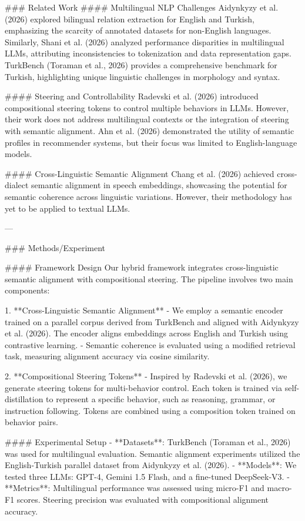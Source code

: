 ### Related Work  
#### Multilingual NLP Challenges  
Aidynkyzy et al. (2026) explored bilingual relation extraction for English and Turkish, emphasizing the scarcity of annotated datasets for non-English languages. Similarly, Shani et al. (2026) analyzed performance disparities in multilingual LLMs, attributing inconsistencies to tokenization and data representation gaps. TurkBench (Toraman et al., 2026) provides a comprehensive benchmark for Turkish, highlighting unique linguistic challenges in morphology and syntax.

#### Steering and Controllability  
Radevski et al. (2026) introduced compositional steering tokens to control multiple behaviors in LLMs. However, their work does not address multilingual contexts or the integration of steering with semantic alignment. Ahn et al. (2026) demonstrated the utility of semantic profiles in recommender systems, but their focus was limited to English-language models.

#### Cross-Linguistic Semantic Alignment  
Chang et al. (2026) achieved cross-dialect semantic alignment in speech embeddings, showcasing the potential for semantic coherence across linguistic variations. However, their methodology has yet to be applied to textual LLMs.

---

### Methods/Experiment  

#### Framework Design  
Our hybrid framework integrates cross-linguistic semantic alignment with compositional steering. The pipeline involves two main components:  

1. **Cross-Linguistic Semantic Alignment**  
   - We employ a semantic encoder trained on a parallel corpus derived from TurkBench and aligned with Aidynkyzy et al. (2026). The encoder aligns embeddings across English and Turkish using contrastive learning.  
   - Semantic coherence is evaluated using a modified retrieval task, measuring alignment accuracy via cosine similarity.  

2. **Compositional Steering Tokens**  
   - Inspired by Radevski et al. (2026), we generate steering tokens for multi-behavior control. Each token is trained via self-distillation to represent a specific behavior, such as reasoning, grammar, or instruction following. Tokens are combined using a composition token trained on behavior pairs.  

#### Experimental Setup  
- **Datasets**: TurkBench (Toraman et al., 2026) was used for multilingual evaluation. Semantic alignment experiments utilized the English-Turkish parallel dataset from Aidynkyzy et al. (2026).  
- **Models**: We tested three LLMs: GPT-4, Gemini 1.5 Flash, and a fine-tuned DeepSeek-V3.  
- **Metrics**: Multilingual performance was assessed using micro-F1 and macro-F1 scores. Steering precision was evaluated with compositional alignment accuracy.

